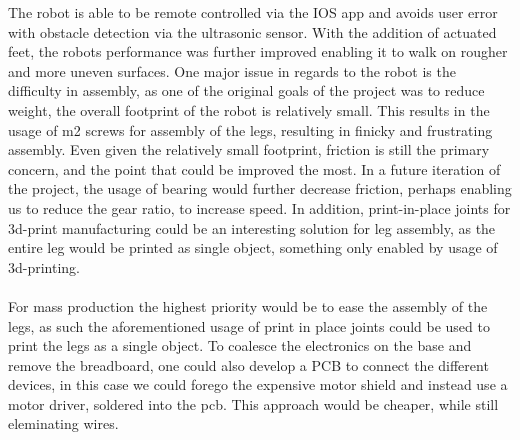 The robot is able to be remote controlled via the IOS app and avoids user error with obstacle detection via the ultrasonic sensor. With the addition of actuated feet, the robots performance was further improved enabling it to walk on rougher and more uneven surfaces. One major issue in regards to the robot is the difficulty in assembly, as one of the original goals of the project was to reduce weight, the overall footprint of the robot is relatively small. This results in the usage of m2 screws for assembly of the legs, resulting in finicky and frustrating assembly. Even given the relatively small footprint, friction is still the primary concern, and the point that could be improved the most. In a future iteration of the project, the usage of bearing would further decrease friction, perhaps enabling us to reduce the gear ratio, to increase speed. In addition, print-in-place joints for 3d-print manufacturing could be an interesting solution for leg assembly, as the entire leg would be printed as single object, something only enabled by usage of 3d-printing. \\ \\ For mass production the highest priority would be to ease the assembly of the legs, as such the aforementioned usage of print in place joints could be used to print the legs as a single object. To coalesce the electronics on the base and remove the breadboard, one could also develop a PCB to connect the different devices, in this case we could forego the expensive motor shield and instead use a motor driver, soldered into the pcb. This approach would be cheaper, while still eleminating wires.